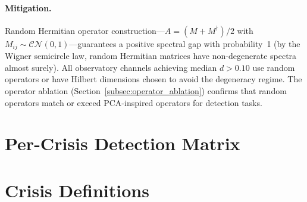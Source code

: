 \documentclass[3p]{elsarticle}
\begin{document}
\paragraph{Mitigation.}
Random Hermitian operator construction---$A = (M + M^\dagger)/2$ with
$M_{ij} \sim \mathcal{CN}(0,1)$---guarantees a positive spectral gap
with probability~1 (by the Wigner semicircle law, random Hermitian
matrices have non-degenerate spectra almost surely).  All observatory
channels achieving median $d > 0.10$ use random operators or have
Hilbert dimensions chosen to avoid the degeneracy regime.  The operator
ablation (Section~\ref{subsec:operator_ablation}) confirms that random
operators match or exceed PCA-inspired operators for detection tasks.

\section{Per-Crisis Detection Matrix}\label{sec:per_crisis_appendix}

\begin{table}[htbp]
\centering
\caption{Per-crisis Cohen's $d$ for selected detection methods.
  Bold indicates the best geometric method beats Hamilton MS for that crisis.}
\label{tab:per_crisis_winners}
\footnotesize
\setlength{\tabcolsep}{3pt}

\end{table}


\section{Crisis Definitions}\label{sec:crisis_definitions}
\end{document}
